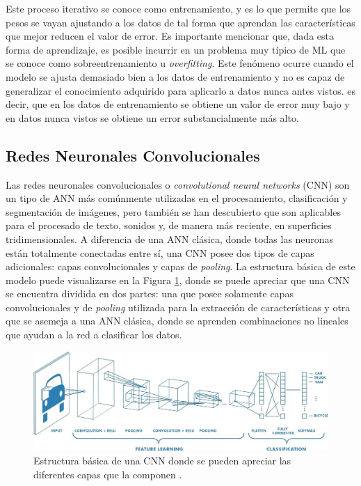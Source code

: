 Este proceso iterativo se conoce como entrenamiento, y es lo que permite que los pesos se vayan ajustando a los datos de tal forma que aprendan  las características que mejor reducen el valor de error. Es importante mencionar que, dada esta forma de aprendizaje, es posible incurrir en un problema muy típico de ML que se conoce como sobreentrenamiento u \textit{overfitting}. Este fenómeno ocurre cuando el modelo se ajusta demasiado bien a los datos de entrenamiento y no es capaz de generalizar el conocimiento adquirido para aplicarlo a datos nunca antes vistos. es decir, que en los datos de entrenamiento se obtiene un valor de error muy bajo y en datos nunca vistos se obtiene un error substancialmente más alto. 

\subsection{Redes Neuronales Convolucionales}
\label{cnnDescription}
Las redes neuronales convolucionales o \textit{convolutional neural networks} (CNN) \cite{lecun_backpropagation_1989, leCUM_CNN} son un tipo de ANN más comúnmente utilizadas en el procesamiento, clasificación y segmentación de imágenes, pero también se han descubierto que son aplicables para el procesado de texto, sonidos y, de manera más reciente, en superficies tridimensionales. A diferencia de una ANN clásica, donde todas las neuronas están totalmente conectadas entre sí, una CNN posee dos tipos de capas adicionales: capas convolucionales y capas de \textit{pooling}. La estructura básica de este modelo puede visualizarse en la Figura \ref{fig:cnnExample}, donde se puede apreciar que una CNN se encuentra dividida en dos partes: una que posee solamente capas convolucionales y de \textit{pooling} utilizada para la extracción de características y otra que se asemeja a una ANN clásica, donde se aprenden combinaciones no lineales que ayudan a la red a clasificar los datos.

\begin{figure}[h]
    \centering
    \includegraphics[width=\linewidth]{imagenes/theory/cnnExample.jpeg}
    \caption[Estructura básica de una red neuronal convolucional]{Estructura básica de una CNN donde se pueden apreciar las diferentes capas que la componen \cite{prabhu_understanding_2019}.}
    \label{fig:cnnExample}
\end{figure}


